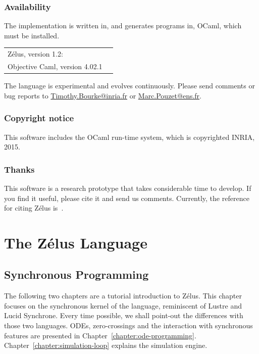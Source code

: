 \documentclass[11pt,titlepage,twoside]{report}
\newcommand{\zelus}{{\sf Z\'elus}}
\newcommand{\lustre}{{\sf Lustre}}
\newcommand{\lucy}{{\sf Lucid Synchrone}}
\newcommand{\ocaml}{{\sf OCaml}}
\begin{document}
\section*{Availability}
The implementation is written in, and generates programs in, \ocaml, which 
must be installed.
\begin{center}
\begin{tabular}{ll}
  \zelus, version 1.2:  & 
  \ahrefurl{\url{http://zelus.di.ens.fr}} \\
  Objective Caml, version 4.02.1  & 
  \ahrefurl{\url{http://www.ocaml.org}}
\end{tabular}
\end{center}
The language is experimental and evolves continuously. Please send
comments or bug reports to \url{Timothy.Bourke@inria.fr} or 
\url{Marc.Pouzet@ens.fr}. 

\section*{Copyright notice}
This software includes the \ocaml{} run-time system, which is
copyrighted INRIA, 2015. 

\section*{Thanks}
This software is a research prototype that takes considerable time to 
develop. If
you find it useful, please cite it and send us comments. 
Currently, the reference for citing \zelus{} is~\cite{lucy:hscc13}.

\cleardoublepage
\part{The Z\'elus Language}
\cleardoublepage

\chapter{Synchronous Programming}
\label{chapter:synchronous-programming}
The following two chapters are a tutorial introduction to \zelus. This
chapter focuses on the synchronous kernel of the language, reminiscent
of \lustre{} and \lucy. Every time possible, we shall point-out the
differences with those two languages. \acp{ODE}, zero-crossings and
the interaction with synchronous features are presented in
Chapter~\ref{chapter:ode-programming}. Chapter~\ref{chapter:simulation-loop}
explains the simulation engine.
\end{document}
